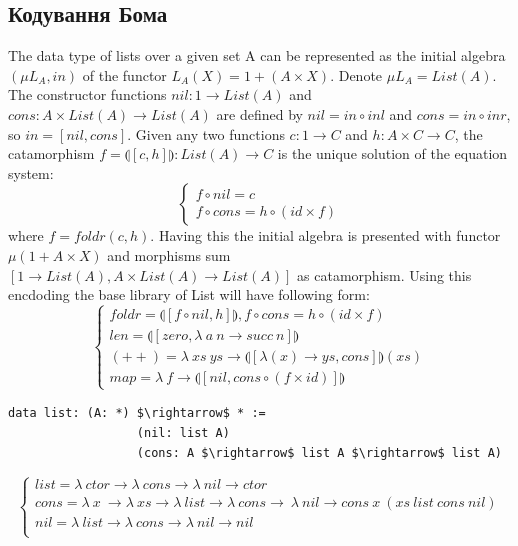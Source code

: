 \begin{definition}
\begin{definition}
\begin{definition}
\begin{definition}
\subsection{Кодування Бома}
The data type of lists over a given set A can be represented as the initial algebra
$(\mu L_A, in)$ of the functor $L_A(X) = 1 + (A \times X)$. Denote $\mu L_A = List(A)$.
The constructor functions $nil: 1 \rightarrow List(A)$ and
$cons: A \times List(A) \rightarrow List(A)$ are defined by
$nil = in \circ inl$ and $cons = in \circ inr$, so $in = [nil,cons]$.
Given any two functions $c: 1 \rightarrow C$ and $h: A \times C \rightarrow C$,
the catamorphism $f = \llparenthesis [c,h] \rrparenthesis : List(A) \rightarrow C$
is the unique solution of the equation system:
$$
\begin{cases}
  f \circ nil  = c \\
  f \circ cons = h \circ (id \times f)
\end{cases}
$$
where $f = foldr(c,h)$. Having this the initial algebra is presented with functor
$\mu (1 + A \times X)$ and morphisms sum $[1 \rightarrow List(A), A \times List(A) \rightarrow List(A)]$
as catamorphism. Using this encdoding the base library of List will have following form:
$$
\begin{cases}
 foldr = \llparenthesis [ f \circ nil , h] \rrparenthesis, f \circ cons = h \circ (id \times f)\\
 len = \llparenthesis [ zero, \lambda\ a\ n \rightarrow succ\ n ] \rrparenthesis \\
 (++) = \lambda\ xs\ ys \rightarrow \llparenthesis [ \lambda (x) \rightarrow ys, cons ] \rrparenthesis (xs) \\
 map = \lambda\ f \rightarrow \llparenthesis [ nil, cons \circ (f \times id)] \rrparenthesis
\end{cases}
$$
\begin{lstlisting}[mathescape=true]
             data list: (A: *) $\rightarrow$ * :=
                  (nil: list A)
                  (cons: A $\rightarrow$ list A $\rightarrow$ list A)
\end{lstlisting}
$$
\begin{cases}
list = \lambda\ ctor \rightarrow \lambda\ cons \rightarrow \lambda\ nil \rightarrow ctor\\
cons = \lambda\ x\ \rightarrow \lambda\ xs \rightarrow \lambda\ list \rightarrow \lambda\ cons \rightarrow\ \lambda\ nil \rightarrow cons\ x\ (xs\ list\ cons\ nil)\\
nil = \lambda\ list \rightarrow \lambda\ cons \rightarrow \lambda\ nil \rightarrow nil\\

\end{cases}$$
\end{definition}
\end{definition}
\end{definition}
\end{definition}
